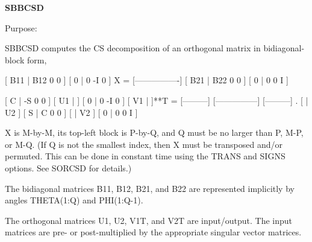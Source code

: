 {\bfseries S\+B\+B\+C\+S\+D} 

 \begin{DoxyParagraph}{Purpose\+: }
\begin{DoxyVerb} SBBCSD computes the CS decomposition of an orthogonal matrix in
 bidiagonal-block form,


     [ B11 | B12 0  0 ]
     [  0  |  0 -I  0 ]
 X = [----------------]
     [ B21 | B22 0  0 ]
     [  0  |  0  0  I ]

                               [  C | -S  0  0 ]
                   [ U1 |    ] [  0 |  0 -I  0 ] [ V1 |    ]**T
                 = [---------] [---------------] [---------]   .
                   [    | U2 ] [  S |  C  0  0 ] [    | V2 ]
                               [  0 |  0  0  I ]

 X is M-by-M, its top-left block is P-by-Q, and Q must be no larger
 than P, M-P, or M-Q. (If Q is not the smallest index, then X must be
 transposed and/or permuted. This can be done in constant time using
 the TRANS and SIGNS options. See SORCSD for details.)

 The bidiagonal matrices B11, B12, B21, and B22 are represented
 implicitly by angles THETA(1:Q) and PHI(1:Q-1).

 The orthogonal matrices U1, U2, V1T, and V2T are input/output.
 The input matrices are pre- or post-multiplied by the appropriate
 singular vector matrices.\end{DoxyVerb}
 
\end{DoxyParagraph}


